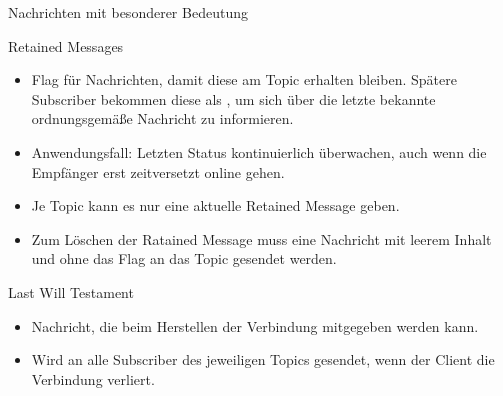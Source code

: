 {
\footnotesize

\begin{frame}{Nachrichten mit besonderer Bedeutung}
    \begin{block}{Retained Messages}
        \begin{itemize}
            \item Flag für Nachrichten, damit diese am Topic erhalten bleiben.
            Spätere Subscriber bekommen diese als ,
            um sich über die letzte bekannte ordnungsgemäße Nachricht zu informieren.

            \item Anwendungsfall: Letzten Status kontinuierlich überwachen, auch
            wenn die Empfänger erst zeitversetzt online gehen.

            \item Je Topic kann es nur eine aktuelle Retained Message geben.

            \item Zum Löschen der Ratained Message muss eine Nachricht mit leerem
            Inhalt und ohne das Flag an das Topic gesendet werden.
         \end{itemize}
    \end{block}

    \bigskip

    \begin{block}{Last Will Testament}
        \begin{itemize}
            \item Nachricht, die beim Herstellen der Verbindung mitgegeben werden kann.

            \item Wird an alle Subscriber des jeweiligen Topics gesendet, wenn der
            Client die Verbindung verliert.
        \end{itemize}
    \end{block}
\end{frame}
}

